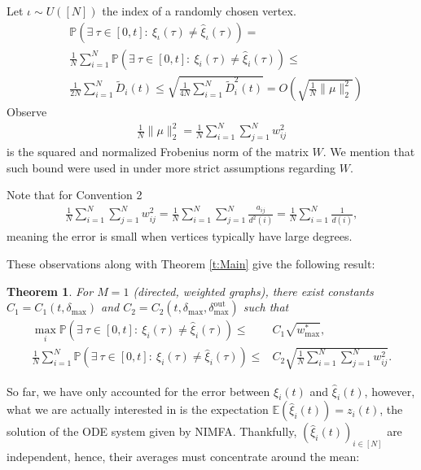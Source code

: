 \documentclass{article}
\newcommand{\pr}{\mathbb{P}}
\newcommand{\E}{\mathbb{E}}
\newcommand{\1}[1]{{\mathds{1}}_{\left\{#1\right\}}}
\newtheorem{theorem}{Theorem}
\newcommand{\remm}[1]{{#1}}
\begin{document}
	Let $\iota \sim U \left([N]\right)$ the index of a randomly chosen vertex.
	\begin{align*}
		&\pr \left(  \exists \ \tau \in [0,t]: \ \xi_{\iota}(\tau) \neq \hat{\xi}_{\iota}(\tau) \right) =\\
		&\frac{1}{N}\sum_{i=1}^N\pr \left(  \exists \ \tau \in [0,t]: \ \xi_{i}(\tau) \neq \hat{\xi}_{i}(\tau) \right) \leq\\
		& \frac{1}{2 N}\sum_{i=1}^{N}\tilde{D}_i(t) \leq \sqrt{\frac{1}{4 N}\sum_{i=1}^{N}\tilde{D}_i^2(t)}=O \left( \sqrt{\frac{1}{ N} \|\mu \|_2^2}\right)
	\end{align*}
	Observe
	\begin{align}
		\label{eq:frobenius}
		\frac{1}{N}\| \mu \|_2^2= \frac{1}{N}\sum_{i=1}^N \sum_{j=1}^{N}w_{ij}^2
	\end{align}
	is the squared and normalized Frobenius norm of the matrix $W.$ We mention that such bound were used in \cite{Sridhar_Kar2} under more strict assumptions regarding $W$.
	
	
	Note that for Convention 2
		\begin{align}
		\label{eq:main4}
		\frac{1}{N}\sum_{i=1}^N \sum_{j=1}^{N}w_{ij}^2=\frac{1}{N}\sum_{i=1}^N \sum_{j=1}^{N}\frac{a_{ij}}{d^2(i)}=\frac{1}{N}\sum_{i=1}^N \frac{1}{d(i)},
		\end{align}
	meaning the error is small when vertices typically have large degrees.
	
	These observations along with Theorem \ref{t:Main} give the following result:
	\begin{theorem}
		\label{t:extra}
		For $M=1$ (directed, weighted graphs), there exist constants $C_1=C_1(t,\delta_{\textrm{max}})$ and $C_2=C_2(t,\delta_{\textrm{max}},\delta_{\textrm{max}}^{\textrm{out}})$ such that
		\begin{align}
			\label{eq:extra1}
			\max_{i}  \pr \left( \exists \ \tau \in [0,t] : \ \xi_{i}(\tau) \neq \hat{\xi}_{i}(\tau) \right) \leq & C_1 \sqrt{\remm{w_{\max}^*}}, \\
			\label{eq:extra2}
			\frac{1}{N} \sum_{i=1}^N\pr \left( \exists \ \tau \in [0,t] : \ \xi_{i}(\tau) \neq \hat{\xi}_{i}(\tau) \right) \leq & C_2 \sqrt{\frac{1}{N}\sum_{i=1}^N \sum_{j=1}^N w_{ij}^2}.
		\end{align}
	\end{theorem}	
  
	So far, we have only accounted for the error between $\xi_i(t)$ and $\hat{\xi}_i(t)$, however, what we are actually interested in is the expectation $\E\left(\hat{\xi}_i(t)\right)=z_i(t)$, the solution of the ODE system given by NIMFA. Thankfully, $\left(\hat{\xi}_{i}(t) \right)_{i \in [N]}$ are independent, hence, their averages must concentrate around the mean:  
	
\end{document}
